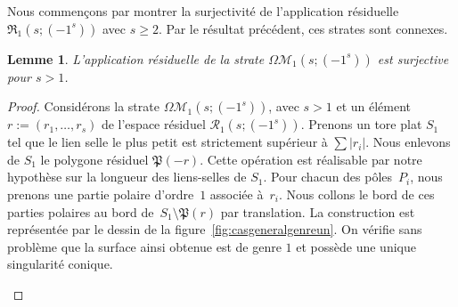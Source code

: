 \documentclass[11pt]{article}
\numberwithin{equation}{section}\renewcommand{\proofname}{Démonstration}
\let\mathcal\mathscr
\newcommand{\appres}[1][g]{\mathfrak{R}_{#1}}
\newcommand{\espres}[1][g]{\mathcal{R}_{#1}}
\newcommand{\omoduli}[1][g]{{\Omega\mathcal M}_{\!#1}}
\newtheorem{lem}[thm]{Lemme}
\theoremstyle{definition}
\begin{document}
Nous commençons par montrer la surjectivité de l'application résiduelle $\appres[1]\!(s;\!(-1^{s}))$ avec $s\geq2$. Par le résultat précédent, ces strates sont connexes.
\begin{lem}\label{lem:gunspe1}
L'application résiduelle de la strate $\omoduli[1](s;(-1^{s}))$ est surjective pour $s>1$.
\end{lem}
\begin{proof}
Considérons la strate $\omoduli[1](s;(-1^{s}))$, avec $s>1$ et un élément $r:=(r_{1},\dots,r_{s})$ de l'espace résiduel $\espres[1](s;(-1^{s}))$. Prenons un tore plat $S_{1}$ tel que le lien selle le plus petit est strictement supérieur à $\sum|r_{i}|$. Nous enlevons de $S_{1}$ le polygone résiduel $\mathfrak{P}(-r)$. Cette opération est réalisable par notre hypothèse sur la longueur des liens-selles de $S_{1}$.
Pour chacun des pôles~$P_{i}$, nous prenons une partie polaire d'ordre~$1$ associée à~$r_{i}$. Nous collons le bord de ces parties polaires au bord de~$S_{1}\setminus \mathfrak{P}(r)$ par translation. La construction est représentée par le dessin de la figure~\ref{fig:casgeneralgenreun}. On vérifie sans problème que la surface ainsi obtenue est de genre $1$ et possède une unique singularité conique.
\begin{figure}[htb]
\center
{}
\end{figure}
\end{proof}
\end{document}

